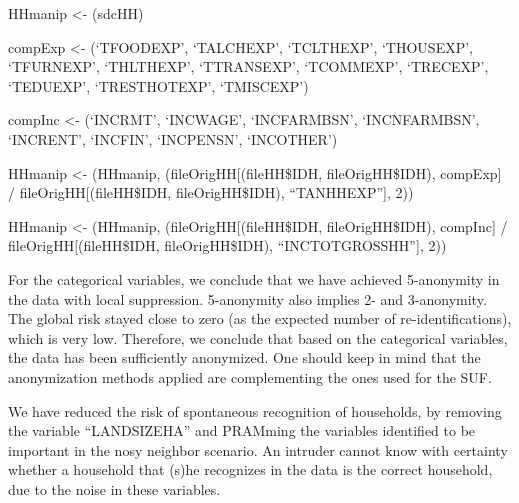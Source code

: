 \documentclass[letterpaper,10pt,english]{sphinxmanual}
\begin{document}
\begin{DUlineblock}{0em}
\item[] 
\item[] HHmanip \textless{}- (sdcHH) 
\item[] 
\item[] compExp \textless{}- (‘TFOODEXP’, ‘TALCHEXP’, ‘TCLTHEXP’, ‘THOUSEXP’,
‘TFURNEXP’, ‘THLTHEXP’, ‘TTRANSEXP’, ‘TCOMMEXP’, ‘TRECEXP’, ‘TEDUEXP’,
‘TRESTHOTEXP’, ‘TMISCEXP’)
\item[] compInc \textless{}- (‘INCRMT’, ‘INCWAGE’, ‘INCFARMBSN’, ‘INCNFARMBSN’,
‘INCRENT’, ‘INCFIN’, ‘INCPENSN’, ‘INCOTHER’)
\item[] HHmanip \textless{}- (HHmanip,
(fileOrigHH{[}(fileHH\$IDH, fileOrigHH\$IDH),
compExp{]} / fileOrigHH{[}(fileHH\$IDH, fileOrigHH\$IDH),
“TANHHEXP”{]}, 2))
\item[] HHmanip \textless{}- (HHmanip,
(fileOrigHH{[}(fileHH\$IDH, fileOrigHH\$IDH),
compInc{]} / fileOrigHH{[}(fileHH\$IDH, fileOrigHH\$IDH),
“INCTOTGROSSHH”{]}, 2))
\end{DUlineblock}


For the categorical variables, we conclude that we have achieved
5-anonymity in the data with local suppression. 5-anonymity also implies
2- and 3-anonymity. The global risk stayed close to zero (as the
expected number of re-identifications), which is very low. Therefore, we
conclude that based on the categorical variables, the data has been
sufficiently anonymized. One should keep in mind that the anonymization
methods applied are complementing the ones used for the SUF. 

We have reduced the risk of spontaneous recognition of households, by
removing the variable “LANDSIZEHA” and PRAMming the variables identified
to be important in the nosy neighbor scenario. An intruder cannot know
with certainty whether a household that (s)he recognizes in the data is
the correct household, due to the noise in these variables.
\end{document}
